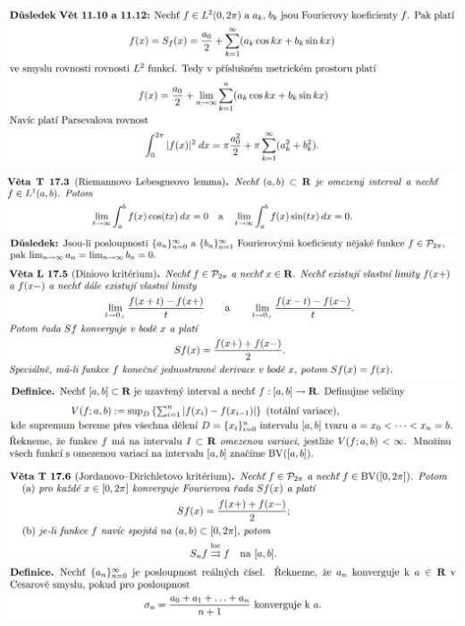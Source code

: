 \documentclass[12pt,a4paper]{article}
\begin{document}
\begin{center}
		\includegraphics[width=\textwidth]{img/4four/2020-06-21 11 44 17.png}\vspace{0.3cm}
		\includegraphics[width=\textwidth]{img/4four/2020-06-21 11 46 20.png}\vspace{0.3cm}
		\includegraphics[width=\textwidth]{img/4four/2020-06-21 11 46 38.png}\vspace{0.3cm}
		\includegraphics[width=\textwidth]{img/4four/2020-06-21 11 47 24.png}\vspace{0.3cm}
		\includegraphics[width=\textwidth]{img/4four/2020-06-21 11 48 27.png}\vspace{0.3cm}
		\includegraphics[width=\textwidth]{img/4four/2020-06-21 11 47 48.png}\vspace{0.3cm}
		\includegraphics[width=\textwidth]{img/4four/2020-06-21 11 49 05.png}\vspace{0.3cm}

\end{center}
\end{document}
